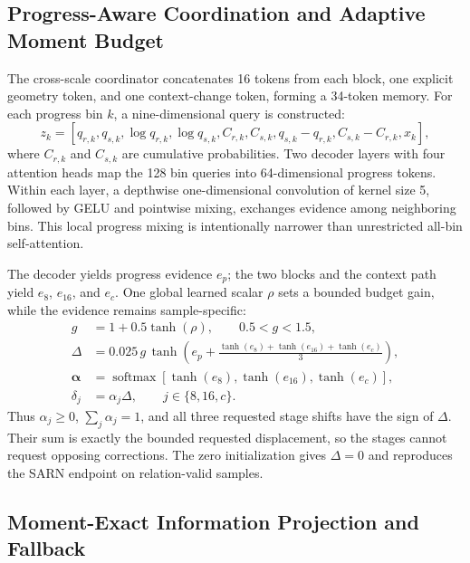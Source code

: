 \documentclass[electronics,article,submit,oneauthor]{Definitions/mdpi}
\begin{document}
\subsection{Progress-Aware Coordination and Adaptive Moment Budget}
\label{subsec:coordinator}

The cross-scale coordinator concatenates 16 tokens from each block, one explicit geometry token, and one context-change token, forming a 34-token memory. For each progress bin $k$, a nine-dimensional query is constructed:
\begin{equation}
z_k=\left[
q_{r,k},q_{s,k},\log q_{r,k},\log q_{s,k},
C_{r,k},C_{s,k},q_{s,k}-q_{r,k},
C_{s,k}-C_{r,k},x_k
\right],
\label{eq:bin_query}
\end{equation}
where $C_{r,k}$ and $C_{s,k}$ are cumulative probabilities. Two decoder layers with four attention heads map the 128 bin queries into 64-dimensional progress tokens. Within each layer, a depthwise one-dimensional convolution of kernel size 5, followed by GELU and pointwise mixing, exchanges evidence among neighboring bins. This local progress mixing is intentionally narrower than unrestricted all-bin self-attention.

The decoder yields progress evidence $e_p$; the two blocks and the context path yield $e_8$, $e_{16}$, and $e_c$. One global learned scalar $\rho$ sets a bounded budget gain, while the evidence remains sample-specific:
\begin{align}
g &= 1+0.5\tanh(\rho), \qquad 0.5<g<1.5, \\
\Delta &= 0.025\,g\,\tanh\left(
e_p+\frac{\tanh(e_8)+\tanh(e_{16})+\tanh(e_c)}{3}
\right), \label{eq:total_shift}\\
\boldsymbol{\alpha} &=
\operatorname{softmax}\!\left[
\tanh(e_8),\tanh(e_{16}),\tanh(e_c)
\right], \\
\delta_j&=\alpha_j\Delta,\qquad j\in\{8,16,c\}.
\label{eq:allocation}
\end{align}
Thus $\alpha_j\geq0$, $\sum_j\alpha_j=1$, and all three requested stage shifts have the sign of $\Delta$. Their sum is exactly the bounded requested displacement, so the stages cannot request opposing corrections. The zero initialization gives $\Delta=0$ and reproduces the SARN endpoint on relation-valid samples.

\subsection{Moment-Exact Information Projection and Fallback}
\label{subsec:transport}
\end{document}
